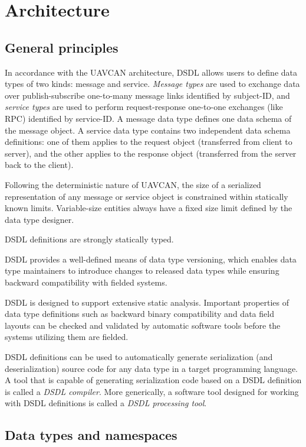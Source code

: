 \section{Architecture}

\subsection{General principles}

In accordance with the UAVCAN architecture, DSDL allows users to define data types of two kinds:
message and service.
\emph{Message types} are used to exchange data over publish-subscribe one-to-many message links identified by subject-ID,
and \emph{service types} are used to perform request-response one-to-one exchanges (like RPC) identified by service-ID.
A message data type defines one data schema of the message object.
A service data type contains two independent data schema definitions:
one of them applies to the request object (transferred from client to server),
and the other applies to the response object (transferred from the server back to the client).

Following the deterministic nature of UAVCAN, the size of a serialized representation of any
message or service object is constrained within statically known limits.
Variable-size entities always have a fixed size limit defined by the data type designer.

DSDL definitions are strongly statically typed.

DSDL provides a well-defined means of data type versioning, which enables data type maintainers to introduce changes
to released data types while ensuring backward compatibility with fielded systems.

DSDL is designed to support extensive static analysis. Important properties of data type definitions such as
backward binary compatibility and data field layouts can be checked and validated by automatic software tools
before the systems utilizing them are fielded.

DSDL definitions can be used to automatically generate serialization (and deserialization) source code
for any data type in a target programming language.
A tool that is capable of generating serialization code based on a DSDL definition is called a \emph{DSDL compiler}.
More generically, a software tool designed for working with DSDL definitions is called a
\emph{DSDL processing tool}.

\subsection{Data types and namespaces}

